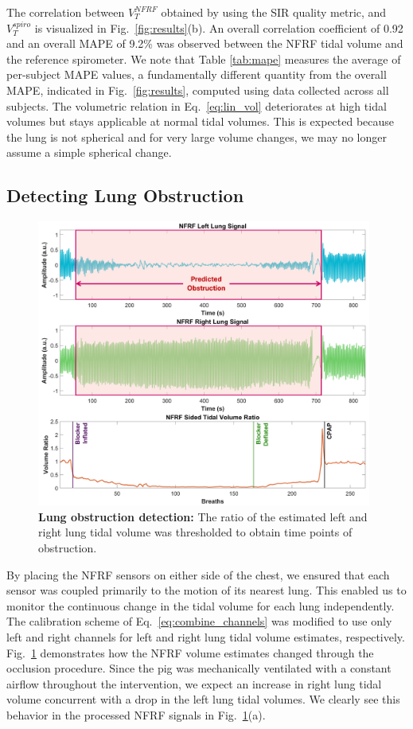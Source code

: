 \documentclass[journal]{IEEEtran}
\begin{document}
\hspace{-0.5em}The correlation between $V^{NFRF}_T$ obtained by using the SIR quality metric, and $V^{spiro}_T$ is visualized in Fig.~\ref{fig:results}(b). An overall correlation coefficient of 0.92 and an overall MAPE of 9.2\% was observed between the NFRF tidal volume and the reference spirometer. We note that Table \ref{tab:mape} measures the average of per-subject MAPE values, a fundamentally different quantity from the overall MAPE, indicated in Fig.~\ref{fig:results}, computed using data collected across all subjects. The volumetric relation in Eq.~\ref{eq:lin_vol} deteriorates at high tidal volumes but stays applicable at normal tidal volumes. This is expected because the lung is not spherical and for very large volume changes, we may no longer assume a simple spherical change.  
\subsection{Detecting Lung Obstruction}
\begin{figure}[ht]
    \centering
    \includegraphics[width=0.98\textwidth]{occlusion_lr.jpg}
    \caption{\textbf{Lung obstruction detection:} The ratio of the estimated left and right lung tidal volume was thresholded to obtain time points of obstruction.}
    \label{fig:occlusion_lr}
\end{figure}
By placing the NFRF sensors on either side of the chest, we ensured that each sensor was coupled primarily to the motion of its nearest lung. This enabled us to monitor the continuous change in the tidal volume for each lung independently. The calibration scheme of Eq.~\ref{eq:combine_channels} was modified to use only left and right channels for left and right lung tidal volume estimates, respectively. Fig.~\ref{fig:occlusion_lr} demonstrates how the NFRF volume estimates changed through the occlusion procedure. Since the pig was mechanically ventilated with a constant airflow throughout the intervention, we expect an increase in right lung tidal volume concurrent with a drop in the left lung tidal volumes. We clearly see this behavior in the processed NFRF signals in Fig.~\ref{fig:occlusion_lr}(a). \\
\end{document}
